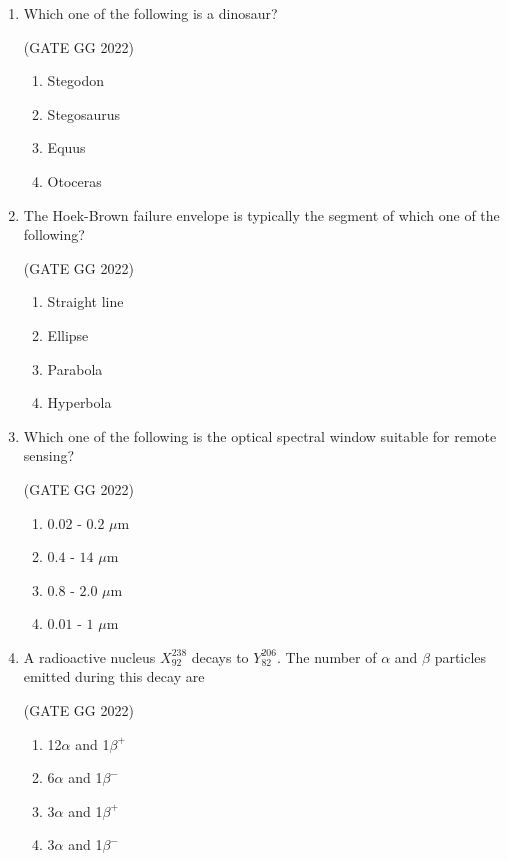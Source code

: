 \documentclass[journal]{IEEEtran}
\begin{document}
\begin{enumerate}[start=1]
\item Which one of the following is a dinosaur?  

\hfill(GATE GG 2022)
\begin{enumerate}
\item Stegodon
\item Stegosaurus
\item Equus
\item Otoceras
\end{enumerate}
\vspace{0.5cm}

\item The Hoek-Brown failure envelope is typically the segment of which one of the following?  

\hfill(GATE GG 2022)
\begin{enumerate}
\item Straight line
\item Ellipse
\item Parabola
\item Hyperbola
\end{enumerate}
\vspace{0.5cm}


\item Which one of the following is the optical spectral window suitable for remote sensing?  

\hfill(GATE GG 2022)
\begin{enumerate}
\item $0.02$ - $0.2$ $\mu$m
\item $0.4$ - $14$ $\mu$m
\item $0.8$ - $2.0$ $\mu$m
\item $0.01$ - $1$ $\mu$m
\end{enumerate}
\vspace{0.5cm}

\item A radioactive nucleus $X_{92}^{238}$ decays to $Y_{82}^{206}$.  
The number of $\alpha$ and $\beta$ particles emitted during this decay are 

\hfill(GATE GG 2022)
\begin{enumerate}
\item 12$\alpha$ and 1$\beta^{+}$
\item 6$\alpha$ and 1$\beta^{-}$
\item 3$\alpha$ and 1$\beta^{+}$
\item 3$\alpha$ and 1$\beta^{-}$ 
\end{enumerate}
\vspace{0.5cm}



\end{enumerate}
\end{document}
